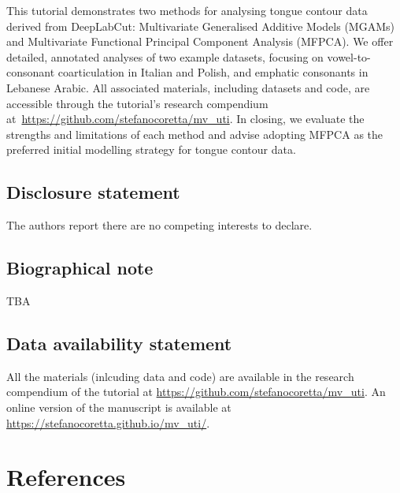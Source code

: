 \documentclass[
]{interact}
\begin{document}
This tutorial demonstrates two methods for analysing tongue contour data
derived from DeepLabCut: Multivariate Generalised Additive Models
(MGAMs) and Multivariate Functional Principal Component Analysis
(MFPCA). We offer detailed, annotated analyses of two example datasets,
focusing on vowel-to-consonant coarticulation in Italian and Polish, and
emphatic consonants in Lebanese Arabic. All associated materials,
including datasets and code, are accessible through the tutorial's
research compendium at~\url{https://github.com/stefanocoretta/mv_uti}.
In closing, we evaluate the strengths and limitations of each method and
advise adopting MFPCA as the preferred initial modelling strategy for
tongue contour data.

\subsection*{Disclosure statement}\label{disclosure-statement}

The authors report there are no competing interests to declare.

\subsection*{Biographical note}\label{biographical-note}

TBA

\subsection*{\texorpdfstring{\textbf{Data availability
statement}}{Data availability statement}}\label{data-availability-statement}

All the materials (inlcuding data and code) are available in the
research compendium of the tutorial at
\url{https://github.com/stefanocoretta/mv_uti}. An online version of the
manuscript is available at
\url{https://stefanocoretta.github.io/mv_uti/}.

\section{References}\label{references}
\end{document}
